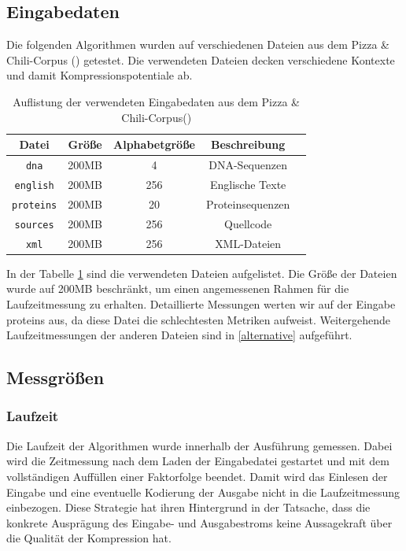 \subsection{Eingabedaten}
Die folgenden Algorithmen wurden auf verschiedenen Dateien aus dem Pizza \& Chili-Corpus (\cite{corpus}) getestet. Die verwendeten Dateien decken verschiedene Kontexte und damit
Kompressionspotentiale ab.
\begin{table}[ht]
    \centering
    \caption{Auflistung der verwendeten Eingabedaten aus dem Pizza \& Chili-Corpus(\cite{corpus})}
    \label{inputdata}
    \begin{tabular}{|c|c|c|c|c|}
        \hline
        \textbf{Datei} & \textbf{Größe} & \textbf{Alphabetgröße} & \textbf{Beschreibung} \\
        \hline
        \texttt{dna} & 200MB & 4 & DNA-Sequenzen \\
        \hline
        \texttt{english} & 200MB & 256 & Englische Texte \\
        \hline
        \texttt{proteins} & 200MB & 20 & Proteinsequenzen \\
        \hline
        \texttt{sources} & 200MB & 256 & Quellcode \\
        \hline
        \texttt{xml} & 200MB & 256 & XML-Dateien \\
        \hline
    \end{tabular}
\end{table}
In der Tabelle \ref{inputdata} sind die verwendeten Dateien aufgelistet. Die Größe der Dateien wurde auf 200MB beschränkt, um einen angemessenen Rahmen für die 
Laufzeitmessung zu erhalten. Detaillierte Messungen werten wir auf der Eingabe proteins aus, da diese Datei die schlechtesten Metriken aufweist. Weitergehende
Laufzeitmessungen der anderen Dateien sind in \ref{alternative} aufgeführt.

\subsection{Messgrößen}

\subsubsection{Laufzeit}
Die Laufzeit der Algorithmen wurde innerhalb der Ausführung gemessen. Dabei wird die Zeitmessung nach dem Laden der Eingabedatei gestartet und mit dem vollständigen
Auffüllen einer Faktorfolge beendet. Damit wird das Einlesen der Eingabe und eine eventuelle Kodierung der Ausgabe nicht in die Laufzeitmessung einbezogen. Diese Strategie
hat ihren Hintergrund in der Tatsache, dass die konkrete Ausprägung des Eingabe- und Ausgabestroms keine Aussagekraft über die Qualität der Kompression hat.

